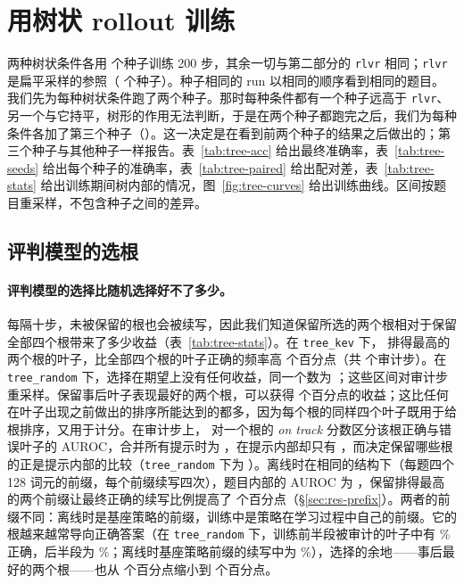 
\section{用树状 rollout 训练}\label{sec:res-tree}

两种树状条件各用  个种子训练 200 步，其余一切与第二部分的 \texttt{rlvr} 相同；\texttt{rlvr} 是扁平采样的参照（ 个种子）。种子相同的 run 以相同的顺序看到相同的题目。我们先为每种树状条件跑了两个种子。那时每种条件都有一个种子远高于 \texttt{rlvr}、另一个与它持平，树形的作用无法判断，于是在两个种子都跑完之后，我们为每种条件各加了第三个种子（）。这一决定是在看到前两个种子的结果之后做出的；第三个种子与其他种子一样报告。表~\ref{tab:tree-acc} 给出最终准确率，表~\ref{tab:tree-seeds} 给出每个种子的准确率，表~\ref{tab:tree-paired} 给出配对差，表~\ref{tab:tree-stats} 给出训练期间树内部的情况，图~\ref{fig:tree-curves} 给出训练曲线。区间按题目重采样，不包含种子之间的差异。

\subsection{评判模型的选根}\label{sec:res-tree-choice}

\paragraph{评判模型的选择比随机选择好不了多少。} 每隔十步，未被保留的根也会被续写，因此我们知道保留所选的两个根相对于保留全部四个根带来了多少收益（表~\ref{tab:tree-stats}）。在 \texttt{tree\_kev} 下，\kev{} 排得最高的两个根的叶子，比全部四个根的叶子正确的频率高   个百分点（共  个审计步）。在 \texttt{tree\_random} 下，选择在期望上没有任何收益，同一个数为  ；这些区间对审计步重采样。保留事后叶子表现最好的两个根，可以获得  个百分点的收益；这比任何在叶子出现之前做出的排序所能达到的都多，因为每个根的同样四个叶子既用于给根排序，又用于计分。在审计步上，\kev{} 对一个根的 \emph{on track} 分数区分该根正确与错误叶子的 AUROC，合并所有提示时为 ，在提示内部却只有  ，而决定保留哪些根的正是提示内部的比较（\texttt{tree\_random} 下为 ）。离线时在相同的结构下（每题四个 128 词元的前缀，每个前缀续写四次），题目内部的 AUROC 为 ，保留排得最高的两个前缀让最终正确的续写比例提高了  个百分点（\S\ref{sec:res-prefix}）。两者的前缀不同：离线时是基座策略的前缀，训练中是策略在学习过程中自己的前缀。它的根越来越常导向正确答案（在 \texttt{tree\_random} 下，训练前半段被审计的叶子中有 \% 正确，后半段为 \%；离线时基座策略前缀的续写中为 \%），选择的余地——事后最好的两个根——也从  个百分点缩小到  个百分点。

